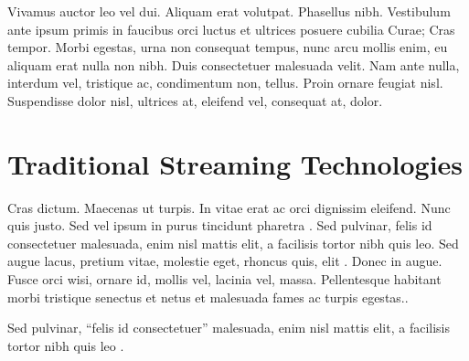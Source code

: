 \cleardoublepage
\label{chap:back}

Vivamus auctor leo vel dui. Aliquam erat volutpat. Phasellus nibh. Vestibulum ante ipsum primis in faucibus orci luctus et ultrices posuere cubilia Curae; Cras tempor. Morbi egestas, urna non consequat tempus, nunc arcu mollis enim, eu aliquam erat nulla non nibh. Duis consectetuer malesuada velit. Nam ante nulla, interdum vel, tristique ac, condimentum non, tellus. Proin ornare feugiat nisl. Suspendisse dolor nisl, ultrices at, eleifend vel, consequat at, dolor.
\section{Traditional Streaming Technologies}
Cras dictum. Maecenas ut turpis. In vitae erat ac orci dignissim eleifend. Nunc quis justo. Sed vel ipsum in purus tincidunt pharetra \cite{MacAulay:2005fk}. Sed pulvinar, felis id consectetuer malesuada, enim nisl mattis elit, a facilisis tortor nibh quis leo. Sed augue lacus, pretium vitae, molestie eget, rhoncus quis, elit \cite{Schwarz:2007lr}. Donec in augue. Fusce orci wisi, ornare id, mollis vel, lacinia vel, massa. Pellentesque habitant morbi tristique senectus et netus et malesuada fames ac turpis egestas..

Sed pulvinar, \enquote{felis id consectetuer} malesuada, enim nisl mattis elit, a facilisis tortor nibh quis leo .

